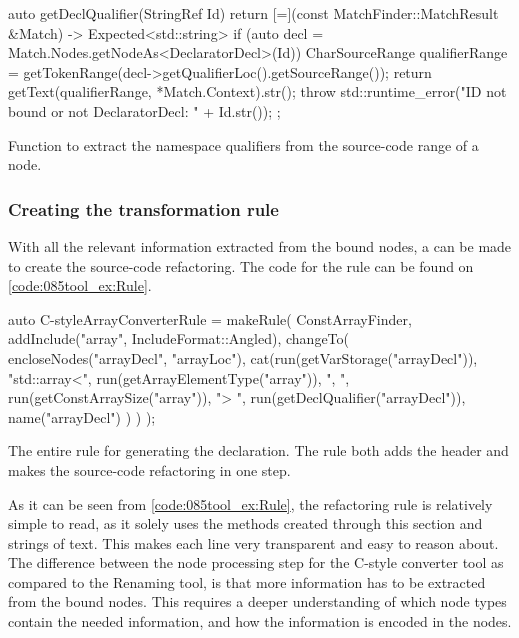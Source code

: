 \begin{listing}[H]
    \begin{cppcode}
auto getDeclQualifier(StringRef Id) {
    return [=](const MatchFinder::MatchResult &Match) -> Expected<std::string> {
        if (auto decl = Match.Nodes.getNodeAs<DeclaratorDecl>(Id)) {
            CharSourceRange qualifierRange = getTokenRange(decl->getQualifierLoc().getSourceRange());
            return getText(qualifierRange, *Match.Context).str();
        }
        throw std::runtime_error("ID not bound or not DeclaratorDecl: " + Id.str());
    };
}
    \end{cppcode}
    \caption{Function to extract the namespace qualifiers from the source-code range of a  node.}
    \label{code:085tool_ex:DeclaratorQualif}
\end{listing}

\subsubsection*{Creating the transformation rule}

With all the relevant information extracted from the bound nodes, a  can be made to create the source-code refactoring. The code for the rule can be found on \cref{code:085tool_ex:Rule}.

\begin{listing}[H]
    \begin{cppcode}
auto C-styleArrayConverterRule = makeRule(
    ConstArrayFinder,
    {
        addInclude("array", IncludeFormat::Angled),
        changeTo(
            encloseNodes("arrayDecl", "arrayLoc"),
            cat(run(getVarStorage("arrayDecl")),
                "std::array<",
                run(getArrayElementType("array")),
                ", ",
                run(getConstArraySize("array")),
                "> ",
                run(getDeclQualifier("arrayDecl")),
                name("arrayDecl")
            )
        )
    });
    \end{cppcode}
    \caption{The entire rule for generating the  declaration. The rule both adds the  header and makes the source-code refactoring in one step.}
    \label{code:085tool_ex:Rule}
\end{listing}

As it can be seen from \cref{code:085tool_ex:Rule}, the refactoring rule is relatively simple to read, as it solely uses the methods created through this section and strings of text. This makes each line very transparent and easy to reason about. The difference between the node processing step for the C-style converter tool as compared to the Renaming tool, is that more information has to be extracted from the bound nodes. This requires a deeper understanding of which node types contain the needed information, and how the information is encoded in the nodes.


